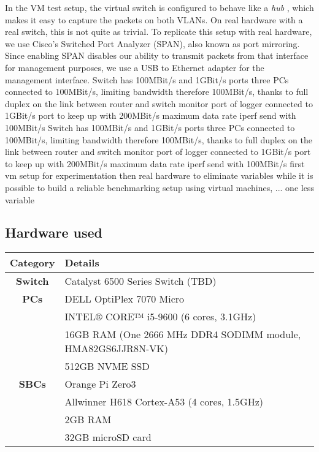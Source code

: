 In the VM test setup, the virtual switch is configured to behave like a \textit{hub} \cite{wiki:Ethernet_hub} \cite{NixOS-VM-test-Hub}, which makes it easy to capture the packets on both VLANs.
On real hardware with a real switch, this is not quite as trivial.
To replicate this setup with real hardware, we use Cisco's Switched Port Analyzer (SPAN), also known as port mirroring.
Since enabling SPAN disables our ability to transmit packets from that interface for management purposes, we use a USB to Ethernet adapter for the management interface.
Switch has 100MBit/s and 1GBit/s ports
three PCs connected to 100MBit/s, limiting bandwidth therefore 100MBit/s, thanks to full duplex on the link between router and switch
monitor port of logger connected to 1GBit/s port to keep up with 200MBit/s maximum data rate
iperf send with 100MBit/s
Switch has 100MBit/s and 1GBit/s ports
three PCs connected to 100MBit/s, limiting bandwidth therefore 100MBit/s, thanks to full duplex on the link between router and switch
monitor port of logger connected to 1GBit/s port to keep up with 200MBit/s maximum data rate
iperf send with 100MBit/s
first vm setup for experimentation
then real hardware to eliminate variables
while it is possible to build a reliable benchmarking setup using virtual machines, ...
one less variable

\subsection{Hardware used}
\begin{table}[h!]
	\centering
	\begin{tabular}{|c|l|}
		\hline
		\textbf{Category} & \textbf{Details} \\ \hline
		\textbf{Switch} & Catalyst 6500 Series Switch (TBD) \\ \hline
		\textbf{PCs} & DELL OptiPlex 7070 Micro \\ \hline
		& INTEL® CORE™ i5-9600 (6 cores, 3.1GHz) \\ \hline
		& 16GB RAM (One 2666 MHz DDR4 SODIMM module, HMA82GS6JJR8N-VK) \\ \hline
		& 512GB NVME SSD \\ \hline
		\textbf{SBCs} & Orange Pi Zero3 \\ \hline
		& Allwinner H618 Cortex-A53 (4 cores, 1.5GHz) \\ \hline
		& 2GB RAM \\ \hline
		& 32GB microSD card \\ \hline
	\end{tabular}
\end{table}

